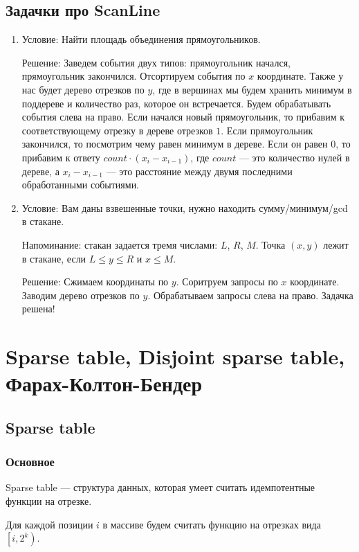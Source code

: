 ﻿\section{Задачки про ScanLine}

\begin{enumerate}
\item
	Условие: Найти площадь объединения прямоугольников.

	Решение: Заведем события двух типов: прямоугольник начался, прямоугольник закончился.
	Отсортируем события по $x$ координате. Также у нас будет дерево отрезков по $y$, где в вершинах
	мы будем хранить минимум в поддереве и количество раз, которое он встречается.
	Будем обрабатывать события слева на право. Если начался новый прямоугольник, то прибавим к
	соответствующему отрезку в дереве отрезков $1$. Если прямоугольник закончился, то посмотрим чему равен минимум в дереве.
	Если он равен $0$, то прибавим к ответу $count \cdot (x_i - x_{i-1})$, где $count$ --- это количество нулей в дереве,
	а $x_i - x_{i - 1}$ --- это расстояние между двумя последними обработанными событиями.

\item
	Условие: Вам даны взвешенные точки, нужно находить сумму/минимум/gcd в стакане.

	Напоминание: стакан задается тремя числами: $L$, $R$, $M$. Точка $(x, y)$ лежит в стакане, если $L \le y \le R$ и $x \le M$.

	Решение: Сжимаем координаты по $y$. Соритруем запросы по $x$ координате. Заводим дерево отрезков по $y$.
	Обрабатываем запросы слева на право. Задачка решена!
\end{enumerate}

\chapter{Sparse table, Disjoint sparse table, Фарах-Колтон-Бендер}

\section{Sparse table}
\subsection{Основное}

Sparse table --- структура данных, которая умеет считать идемпотентные функции на отрезке.

Для каждой позиции $i$ в массиве будем считать функцию на отрезках вида $\left[i, 2^k\right)$.

